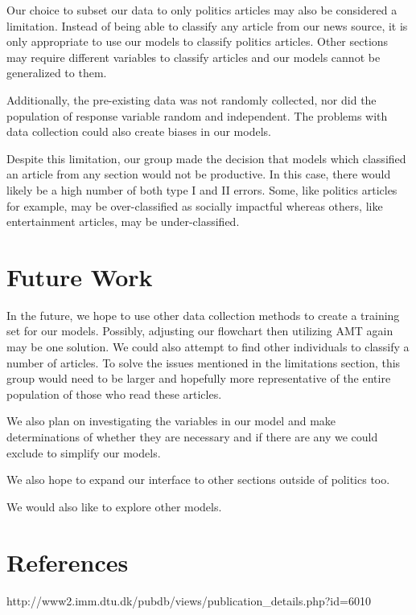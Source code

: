 \documentclass[10pt,letterpaper]{article}
\begin{document}
Our choice to subset our data to only politics articles may also be
considered a limitation. Instead of being able to classify any article
from our news source, it is only appropriate to use our models to
classify politics articles. Other sections may require different
variables to classify articles and our models cannot be generalized to
them.

Additionally, the pre-existing data was not randomly collected, nor did
the population of response variable random and independent. The problems
with data collection could also create biases in our models.

Despite this limitation, our group made the decision that models which
classified an article from any section would not be productive. In this
case, there would likely be a high number of both type I and II errors.
Some, like politics articles for example, may be over-classified as
socially impactful whereas others, like entertainment articles, may be
under-classified.

\hypertarget{future-work}{%
\section{Future Work}\label{future-work}}

In the future, we hope to use other data collection methods to create a
training set for our models. Possibly, adjusting our flowchart then
utilizing AMT again may be one solution. We could also attempt to find
other individuals to classify a number of articles. To solve the issues
mentioned in the limitations section, this group would need to be larger
and hopefully more representative of the entire population of those who
read these articles.

We also plan on investigating the variables in our model and make
determinations of whether they are necessary and if there are any we
could exclude to simplify our models.

We also hope to expand our interface to other sections outside of
politics too.

We would also like to explore other models.

\hypertarget{references}{%
\section*{References}\label{references}}

http://www2.imm.dtu.dk/pubdb/views/publication\_details.php?id=6010
\end{document}
